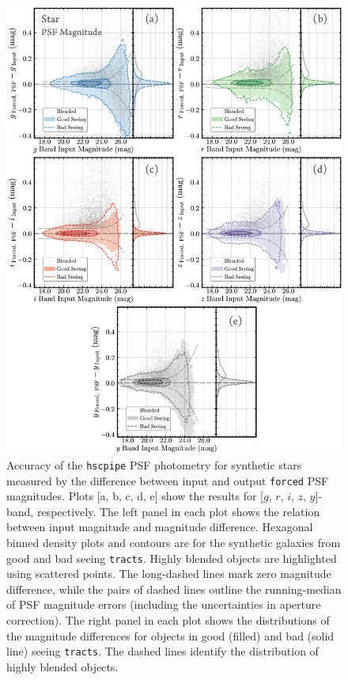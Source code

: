 \documentclass[useamsfonts]{pasj01}
\def\forced{\texttt{forced}}
\def\tracts{\texttt{tracts}}
\begin{document}
\begin{figure}
    \begin{center}
        \includegraphics[width=16cm]{fig/synpipe_psf_mag}
    \end{center}
    \caption{
        Accuracy of the \texttt{hscpipe} PSF photometry for synthetic stars measured
        by the difference between input and output \forced{} PSF magnitudes.
        Plots [a, b, c, d, e] show the results for [$g$, $r$, $i$, $z$, $y$]-band, 
        respectively.
        The left panel in each plot shows the relation between input magnitude and
        magnitude difference.
        Hexagonal binned density plots and contours are for the synthetic galaxies 
        from good and bad seeing \tracts{}.
        Highly blended objects are highlighted using scattered points.
        The long-dashed lines mark zero magnitude difference, while the pairs of
        dashed lines outline the running-median of PSF magnitude errors
        (including the uncertainties in aperture correction).
        The right panel in each plot shows the distributions of the magnitude 
        differences for objects in good (filled) and bad (solid line) seeing \tracts{}.
        The dashed lines identify the distribution of highly blended objects.
        }
    \label{fig:psf_mag}
\end{figure}
\end{document}
